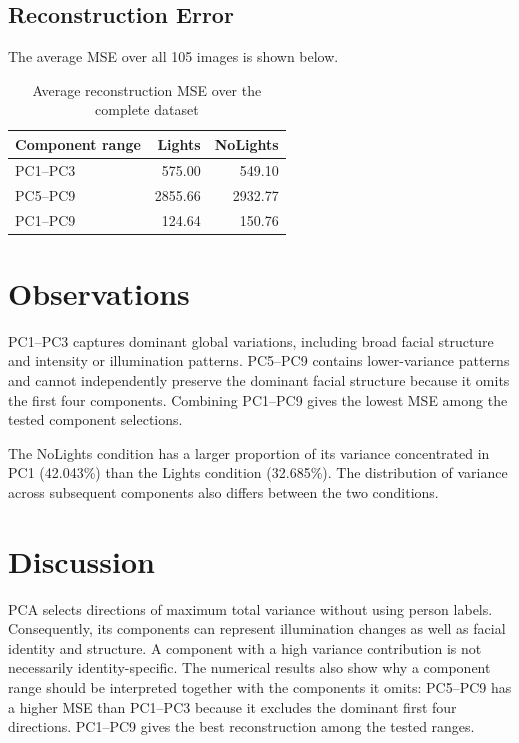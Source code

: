 \documentclass[12pt,a4paper]{report}
\begin{document}
\subsection{Reconstruction Error}
The average MSE over all 105 images is shown below.

\begin{table}[H]
\centering
\caption{Average reconstruction MSE over the complete dataset}
\begin{tabular}{lrr}
\toprule
Component range & Lights & NoLights\\
\midrule
PC1--PC3 & 575.00 & 549.10\\
PC5--PC9 & 2855.66 & 2932.77\\
PC1--PC9 & 124.64 & 150.76\\
\bottomrule
\end{tabular}
\end{table}

\section{Observations}
PC1--PC3 captures dominant global variations, including broad facial structure and intensity or illumination patterns. PC5--PC9 contains lower-variance patterns and cannot independently preserve the dominant facial structure because it omits the first four components. Combining PC1--PC9 gives the lowest MSE among the tested component selections.

The NoLights condition has a larger proportion of its variance concentrated in PC1 (42.043\%) than the Lights condition (32.685\%). The distribution of variance across subsequent components also differs between the two conditions.

\section{Discussion}
PCA selects directions of maximum total variance without using person labels. Consequently, its components can represent illumination changes as well as facial identity and structure. A component with a high variance contribution is not necessarily identity-specific. The numerical results also show why a component range should be interpreted together with the components it omits: PC5--PC9 has a higher MSE than PC1--PC3 because it excludes the dominant first four directions. PC1--PC9 gives the best reconstruction among the tested ranges.

\end{document}
